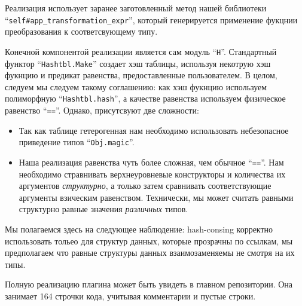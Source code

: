 Реализация использует заранее заготовленный метод нашей библиотеки
``\lstinline{self#app_transformation_expr}'', который генерируется применение фукцнии преобразования к соответсвующему типу.

Конечной компонентой реализации является сам  модуль ``\lstinline{H}''. Стандартный функтор ``\lstinline{Hashtbl.Make}'' создает хэш таблицы, используя некотрую хэш фукнцию и предикат равенства, предоставленные пользователем. В целом, следуем мы следуем такому соглашению: как хэш фукнцию используем полиморфную ``\lstinline{Hashtbl.hash}'', а качестве равенства используем физическое равенство ``\lstinline{==}''. Однако, присутсвуют две сложности:

\begin{itemize}
\item Так как таблице гетерогенная нам необходимо использовать небезопасное приведение типов ``\lstinline{Obj.magic}''.
\item Наша реализация равенства чуть более сложная, чем обычное ``\lstinline{==}''. Нам необходимо стравнивать верхнеуровневые конструкторы и количества их аргументов  \emph{структурно}, а только затем сравнивать соответствующие аргументы взическим равенством. Технически, мы может считать равными структурно равные значения   \emph{различных} типов.
\end{itemize}

Мы полагаемся здесь на следующее наблюдение: hash-consing корректно использовать тольео для структур данных, которые прозрачны по ссылкам, мы предполагаем что равные структуры данных взаимозаменяемы не смотря на их типы. 

Полную реализацию плагина может быть увидеть в главном репозитории. Она занимает 164 строчки кода, учитывая комментарии и пустые строки.

